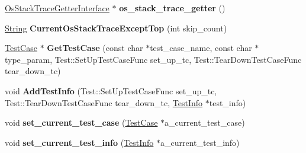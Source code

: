 \begin{DoxyCompactItemize}
\item 
\mbox{\label{classtesting_1_1internal_1_1_unit_test_impl_a71753679854f7fbba6c1568eb422fecb}} 
\mbox{\hyperlink{classtesting_1_1internal_1_1_os_stack_trace_getter_interface}{Os\+Stack\+Trace\+Getter\+Interface}} $\ast$ {\bfseries os\+\_\+stack\+\_\+trace\+\_\+getter} ()
\item 
\mbox{\label{classtesting_1_1internal_1_1_unit_test_impl_ae3bbdaca4798c3073b29945bdbd8c1e9}} 
\mbox{\hyperlink{classtesting_1_1internal_1_1_string}{String}} {\bfseries Current\+Os\+Stack\+Trace\+Except\+Top} (int skip\+\_\+count)
\item 
\mbox{\label{classtesting_1_1internal_1_1_unit_test_impl_ac5684d824a59e963cb3274c79d0b6df3}} 
\mbox{\hyperlink{classtesting_1_1_test_case}{Test\+Case}} $\ast$ {\bfseries Get\+Test\+Case} (const char $\ast$test\+\_\+case\+\_\+name, const char $\ast$type\+\_\+param, Test\+::\+Set\+Up\+Test\+Case\+Func set\+\_\+up\+\_\+tc, Test\+::\+Tear\+Down\+Test\+Case\+Func tear\+\_\+down\+\_\+tc)
\item 
\mbox{\label{classtesting_1_1internal_1_1_unit_test_impl_a1cc87dfc91377ebec4a3ff4192dfcba9}} 
void {\bfseries Add\+Test\+Info} (Test\+::\+Set\+Up\+Test\+Case\+Func set\+\_\+up\+\_\+tc, Test\+::\+Tear\+Down\+Test\+Case\+Func tear\+\_\+down\+\_\+tc, \mbox{\hyperlink{classtesting_1_1_test_info}{Test\+Info}} $\ast$test\+\_\+info)
\item 
\mbox{\label{classtesting_1_1internal_1_1_unit_test_impl_a7f0e79bdabd28819cc857e316a36a350}} 
void {\bfseries set\+\_\+current\+\_\+test\+\_\+case} (\mbox{\hyperlink{classtesting_1_1_test_case}{Test\+Case}} $\ast$a\+\_\+current\+\_\+test\+\_\+case)
\item 
\mbox{\label{classtesting_1_1internal_1_1_unit_test_impl_ab72211c99ce4427dfb472d6ecea62989}} 
void {\bfseries set\+\_\+current\+\_\+test\+\_\+info} (\mbox{\hyperlink{classtesting_1_1_test_info}{Test\+Info}} $\ast$a\+\_\+current\+\_\+test\+\_\+info)
\item 
\mbox{\label{classtesting_1_1internal_1_1_unit_test_impl_af84d2515f1a272a8783f00a3e8c0aff8}} 

\end{DoxyCompactItemize}
